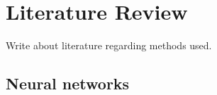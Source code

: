 \chapter{Literature Review}
Write about literature regarding methods used.

\section{Neural networks}


